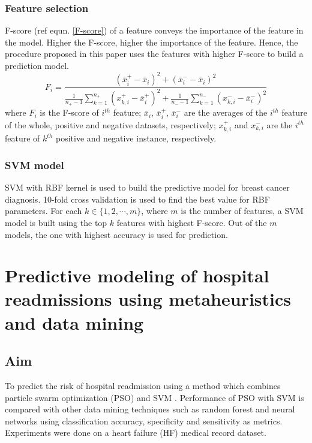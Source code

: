 \documentclass[twoside]{iitbreport}
\begin{document}
\subsubsection{Feature selection}
F-score (ref equn. \ref{F-score}) of a feature conveys the importance of the feature in the model. Higher the F-score, higher the importance of the feature. Hence, the procedure proposed in this paper uses the features with higher F-score to build a prediction model.
\begin{equation}\label{F-score}
F_i = \frac{(\bar{x}_i^+ - \bar{x}_i)^2+(\bar{x}_i^- - \bar{x}_i)^2}{\frac{1}{n_+-1}\sum_{k=1}^{n_+}(x_{k,i}^+-\bar{x}_i^+)^2+\frac{1}{n_--1}\sum_{k=1}^{n_-}(x_{k,i}^--\bar{x}_i^-)^2}
\end{equation}
where $F_i$ is the F-score of $i^{th}$ feature; $\bar{x}_i$, $\bar{x}_i^+$, $\bar{x}_i^-$ are the averages of the $i^{th}$ feature of the whole, positive and negative datasets, respectively; $x_{k,i}^+$ and $x_{k,i}^-$ are the $i^{th}$ feature of $k^{th}$ positive and negative instance, respectively.

\subsubsection{SVM model}
SVM with RBF kernel is used to build the predictive model for breast cancer diagnosis. 10-fold cross validation is used to find the best value for RBF parameters. For each $k \in \{1,2,\cdots,m\}$, where $m$ is the number of features, a SVM model is built using the top $k$ features with highest F-score. Out of the $m$ models, the one with highest accuracy is used for prediction.      


\section{Predictive modeling of hospital readmissions using metaheuristics and data mining}
\subsection{Aim}
To predict the risk of hospital readmission using a method which combines particle swarm optimization (PSO) and SVM \cite{zheng2015predictive}. Performance of PSO with SVM is compared with other data mining techniques such as random forest and neural networks using classification accuracy, specificity and sensitivity as metrics. Experiments were done on a heart failure (HF) medical record dataset.  
\end{document}
